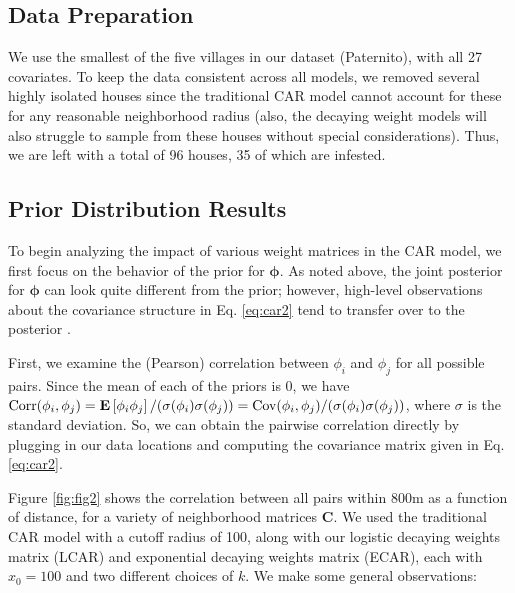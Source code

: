 \documentclass{scrartcl}
\newcommand{\todo}[1]{\textcolor{red}{TODO:
    #1}\PackageWarning{TODO:}{#1!}}
\newcommand{\expect}[1]{\operatorname{\textnormal{\textbf{E}}}\left[#1\right]}
\newcommand{\mat}[1]{\bm{#1}}
\begin{document}
\subsection{Data Preparation}
\label{sec:spatial-data}

We use the smallest of the five villages in our dataset (Paternito),
with all 27 covariates. 
To keep the data consistent across all models, we removed
several highly isolated houses since the traditional CAR model cannot
account for these for any reasonable neighborhood radius (also, the
decaying weight models will also struggle to sample from these houses
without special considerations). Thus, we are left with a total of 96
houses, 35 of which are infested.

\subsection{Prior Distribution Results}
\label{sec:prior-distr-results}

To begin analyzing the impact of various weight matrices in the CAR
model, we first focus on the behavior of the prior for
$\mat{\phi}$. As noted above, the joint posterior for $\mat{\phi}$ can
look quite different from the prior; however, high-level observations
about the covariance structure in Eq. \eqref{eq:car2} tend to transfer
over to the posterior \cite{Assuncao2009}.

First, we examine the (Pearson) correlation between $\phi_i$ and
$\phi_j$ for all possible pairs. Since the mean of each of the priors
is 0, we have
$\text{Corr}(\phi_i, \phi_j) = \expect{\phi_i \phi_j} /
(\sigma(\phi_i) \sigma(\phi_j)) = \text{Cov}(\phi_i, \phi_j) /
(\sigma(\phi_i) \sigma(\phi_j))$, where $\sigma$ is the standard
deviation. So, we can obtain the pairwise correlation directly by
plugging in our data locations and computing the covariance matrix
given in Eq. \eqref{eq:car2}.

Figure \ref{fig:fig2} shows the correlation between all pairs within
800m as a function of distance, for a variety of neighborhood matrices
$\mat{C}$. We used the traditional CAR model with a cutoff radius of
100, along with our logistic decaying weights matrix (LCAR) and
exponential decaying weights matrix (ECAR), each with $x_0 = 100$ and
two different choices of $k$. We make some general observations:
\end{document}
